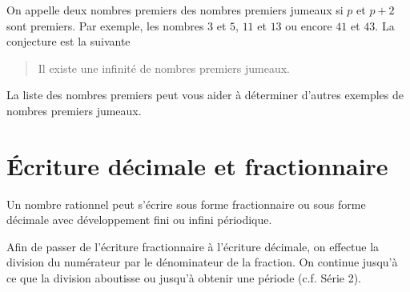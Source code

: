 \documentclass[a4paper,12pt]{report}
\begin{document}
On appelle deux nombres premiers des nombres premiers jumeaux si $p$ et $p+2$ sont premiers.
Par exemple, les nombres $3$ et $5$, $11$ et $13$ ou encore $41$ et $43$. La conjecture est la suivante
\begin{quotation}
	Il existe une infinité de nombres premiers jumeaux.
\end{quotation}
La liste des nombres premiers peut vous aider à déterminer d'autres exemples de nombres premiers jumeaux. 

\section{Écriture décimale et fractionnaire}
Un nombre rationnel peut s'écrire sous forme fractionnaire ou sous forme décimale avec développement fini ou infini périodique. 
\begin{technique}
	Afin de passer de l'écriture fractionnaire à l'écriture décimale, on effectue la division du numérateur par le dénominateur de la fraction.
	On continue jusqu'à ce que la division aboutisse ou jusqu'à obtenir une période (c.f. Série 2).  
\end{technique}
\end{document}
